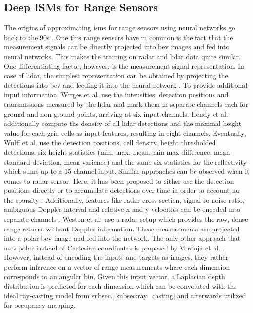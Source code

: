 \subsection{Deep ISMs for Range Sensors}
\label{subsec:deep_ism_range}
The origins of approximating \gls{ism}s for range sensors using neural networks go back to the 90s \cite{van1995neural,thrun1993exploration}. One this range sensors have in common is the fact that the measurement signals can be directly projected into \gls{bev} images and fed into neural networks. This makes the training on radar and lidar data quite similar. One differentiating factor, however, is the measurement signal representation. In case of lidar, the simplest representation can be obtained by projecting the detections into \gls{bev} and feeding it into the neural network \cite{liang2018deep}. To provide additional input information, Wirges et al. \cite{wirges2018evidential} use the intensities, detection positions and transmissions measured by the lidar and mark them in separate channels each for ground and non-ground points, arriving at six input channels. Hendy et al. \cite{hendy2020fishing} additionally compute the density of all lidar detections and the maximal height value for each grid cells as input features, resulting in eight channels. Eventually, Wulff et al. \cite{wulff2018early} use the detection positions, cell density, height thresholded detections, six height statistics (min, max, mean, min-max difference, mean-standard-deviation, mean-variance) and the same six statistics for the reflectivity which sums up to a 15 channel input. Similar approaches can be observed when it comes to radar sensor. Here, it has been proposed to either use the detection positions directly \cite{sless2019road} or to accumulate detections over time in order to account for the sparsity \cite{prophet2019semantic,lombacher2017semantic}. Additionally, features like radar cross section, signal to noise ratio, ambiguous Doppler interval and relative x and y velocities can be encoded into separate channels \cite{hendy2020fishing}. Weston et al. \cite{weston2019probably} use a radar setup which provides the raw, dense range returns without Doppler information. These measurements are projected into a polar \gls{bev} image and fed into the network. The only other approach that uses polar instead of Cartesian coordinates is proposed by Verdoja et al. \cite{verdoja2019deep}. However, instead of encoding the inputs and targets as images, they rather perform inference on a vector of range measurements where each dimension corresponds to an angular bin. Given this input vector, a Laplacian depth distribution is predicted for each dimension which can be convoluted with the ideal ray-casting model from subsec. \ref{subsec:ray_casting} and afterwards utilized for occupancy mapping.\\
%
